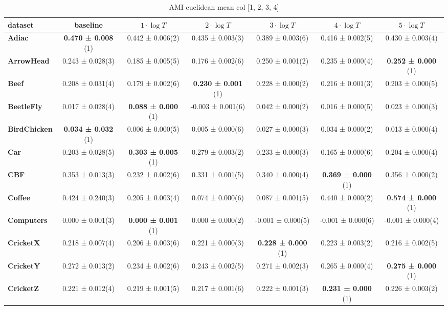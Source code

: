     \begin{table}[ht]
    \caption{AMI euclidean mean col [1, 2, 3, 4]} 
    \begin{adjustbox}{width=\textwidth}
    \begin{tabular}{lcccccc}
    \hline
    dataset & baseline & \textbf{$1\cdot \log{T}$} & \textbf{$2\cdot \log{T}$} & \textbf{$3\cdot \log{T}$} & \textbf{$4\cdot \log{T}$} & \textbf{$5\cdot \log{T}$} \\ \hline
    \textbf{Adiac} & \textbf{0.470 ± 0.008} (1) & 0.442 ± 0.006(2) & 0.435 ± 0.003(3) & 0.389 ± 0.003(6) & 0.416 ± 0.002(5) & 0.430 ± 0.003(4) \\
    \textbf{ArrowHead} & 0.243 ± 0.028(3) & 0.185 ± 0.005(5) & 0.176 ± 0.002(6) & 0.250 ± 0.001(2) & 0.235 ± 0.000(4) & \textbf{0.252 ± 0.000} (1) \\
    \textbf{Beef} & 0.208 ± 0.031(4) & 0.179 ± 0.002(6) & \textbf{0.230 ± 0.001} (1) & 0.228 ± 0.000(2) & 0.216 ± 0.001(3) & 0.203 ± 0.000(5) \\
    \textbf{BeetleFly} & 0.017 ± 0.028(4) & \textbf{0.088 ± 0.000} (1) & -0.003 ± 0.001(6) & 0.042 ± 0.000(2) & 0.016 ± 0.000(5) & 0.023 ± 0.000(3) \\
    \textbf{BirdChicken} & \textbf{0.034 ± 0.032} (1) & 0.006 ± 0.000(5) & 0.005 ± 0.000(6) & 0.027 ± 0.000(3) & 0.034 ± 0.000(2) & 0.013 ± 0.000(4) \\
    \textbf{Car} & 0.203 ± 0.028(5) & \textbf{0.303 ± 0.005} (1) & 0.279 ± 0.003(2) & 0.233 ± 0.000(3) & 0.165 ± 0.000(6) & 0.204 ± 0.000(4) \\
    \textbf{CBF} & 0.353 ± 0.013(3) & 0.232 ± 0.002(6) & 0.331 ± 0.001(5) & 0.340 ± 0.000(4) & \textbf{0.369 ± 0.000} (1) & 0.356 ± 0.000(2) \\
    \textbf{Coffee} & 0.424 ± 0.240(3) & 0.205 ± 0.003(4) & 0.074 ± 0.000(6) & 0.087 ± 0.001(5) & 0.440 ± 0.000(2) & \textbf{0.574 ± 0.000} (1) \\
    \textbf{Computers} & 0.000 ± 0.001(3) & \textbf{0.000 ± 0.001} (1) & 0.000 ± 0.000(2) & -0.001 ± 0.000(5) & -0.001 ± 0.000(6) & -0.001 ± 0.000(4) \\
    \textbf{CricketX} & 0.218 ± 0.007(4) & 0.206 ± 0.003(6) & 0.221 ± 0.000(3) & \textbf{0.228 ± 0.000} (1) & 0.223 ± 0.003(2) & 0.216 ± 0.002(5) \\
    \textbf{CricketY} & 0.272 ± 0.013(2) & 0.234 ± 0.002(6) & 0.243 ± 0.002(5) & 0.271 ± 0.002(3) & 0.265 ± 0.000(4) & \textbf{0.275 ± 0.000} (1) \\
    \textbf{CricketZ} & 0.221 ± 0.012(4) & 0.219 ± 0.001(5) & 0.217 ± 0.001(6) & 0.222 ± 0.001(3) & \textbf{0.231 ± 0.000} (1) & 0.226 ± 0.003(2) \\

\end{tabular}
\end{adjustbox}
\end{table}

